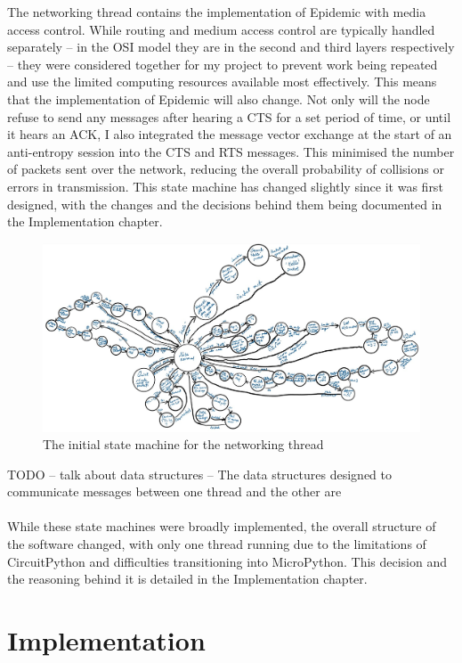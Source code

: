 \documentclass[12pt,a4paper]{report}
\newcommand{\newchapter}[2]{
    \setcounter{chapter}{#1}
    \setcounter{section}{0}
    \chapter*{#2}
    \addcontentsline{toc}{chapter}{#1 #2}
}
\begin{document}
\FloatBarrier
The networking thread contains the implementation of Epidemic with media access control. While routing and medium access control are typically handled separately -- in the OSI model they are in the second and third layers respectively -- they were considered together for my project to prevent work being repeated and use the limited computing resources available most effectively. This means that the implementation of Epidemic will also change. Not only will the node refuse to send any messages after hearing a CTS for a set period of time, or until it hears an ACK, I also integrated the message vector exchange at the start of an anti-entropy session into the CTS and RTS messages. This minimised the number of packets sent over the network, reducing the overall probability of collisions or errors in transmission. This state machine has changed slightly since it was first designed, with the changes and the decisions behind them being documented in the Implementation chapter. 
\begin{figure}[h]
\begin{center}
\caption{The initial state machine for the networking thread}
\includegraphics[scale=0.5]{net.jpg}
\end{center}
\end{figure}
\FloatBarrier
TODO -- talk about data structures -- The data structures designed to communicate messages between one thread and the other are  \\ \\
While these state machines were broadly implemented, the overall structure of the software changed, with only one thread running due to the limitations of CircuitPython and difficulties transitioning into MicroPython. This decision and the reasoning behind it is detailed in the Implementation chapter. 

\newchapter{3}{Implementation}
\end{document}
